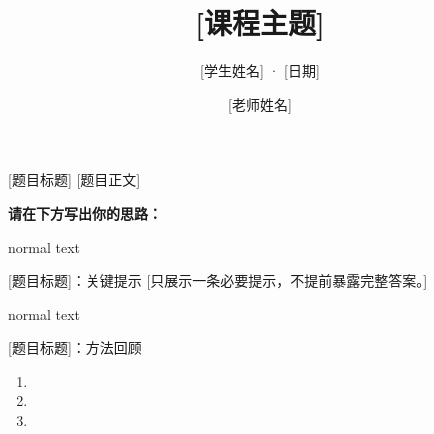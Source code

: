 \documentclass[aspectratio=169]{ctexbeamer}
\title{[课程主题]}
\subtitle{[学生姓名] · [日期]}
\author{[老师姓名]}
\date{}
\newcommand{\writingspace}[1][0.48\textheight]{
  \par\vspace{0.4em}
  \begin{beamercolorbox}[wd=\textwidth,ht=#1,dp=0ex]{normal text}
  \end{beamercolorbox}
}
\begin{document}
\begin{frame}
  \titlepage
\end{frame}

\begin{frame}{[题目标题]}
  [题目正文]

  \textbf{请在下方写出你的思路：}
  \writingspace
\end{frame}

\begin{frame}{[题目标题]：关键提示}
  [只展示一条必要提示，不提前暴露完整答案。]

  \writingspace[0.36\textheight]
\end{frame}

\begin{frame}{[题目标题]：方法回顾}
  \begin{enumerate}
    \item [识别信号]
    \item [关键步骤]
    \item [检查方式]
  \end{enumerate}
\end{frame}
\end{document}
